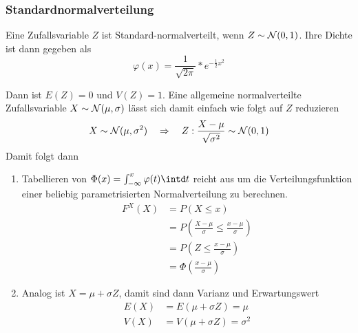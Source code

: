 \subsubsection{Standardnormalverteilung}
Eine Zufallsvariable $Z$ ist Standard-normalverteilt, wenn $Z\sim\mathcal{N}(0,1)$.
Ihre Dichte ist dann gegeben als
\begin{equation*}
	\varphi(x)=\frac{1}{\sqrt{2\pi}}*e^{-\frac12x^2}
\end{equation*}

Dann ist $E(Z)=0$ und $V(Z)=1$. Eine allgemeine normalverteilte Zufallsvariable $X\sim\mathcal{N}(\mu,\sigma)$ lässt sich damit einfach wie folgt auf $Z$ reduzieren
\begin{equation*}
	X\sim\mathcal{N}(\mu, \sigma^2)\quad\Rightarrow\quad Z:\frac{X-\mu}{\sqrt{\sigma^2}}\sim\mathcal{N}(0,1)
\end{equation*}
Damit folgt dann
\begin{enumerate}
	\item Tabellieren von $\Phi(x)=\int_{-\infty}^x \varphi(t)\intd t$ reicht aus um die Verteilungsfunktion einer beliebig parametrisierten Normalverteilung zu berechnen.
	\begin{align*}
		F^X(X)&=P(X\leq x)\\
		&=P\left(\frac{X-\mu}{\sigma}\leq \frac{x-\mu}{\sigma}\right)\\
		&=P\left(Z\leq\frac{x-\mu}{\sigma}\right)\\
		&=\Phi\left(\frac{x-\mu}{\sigma}\right)
	\end{align*}
	\item Analog ist $X=\mu+\sigma Z$, damit sind dann Varianz und Erwartungswert
	\begin{align*}
		E(X)&=E(\mu+\sigma Z)=\mu\\
		V(X)&=V(\mu+\sigma Z)=\sigma^2
	\end{align*}
\end{enumerate}



